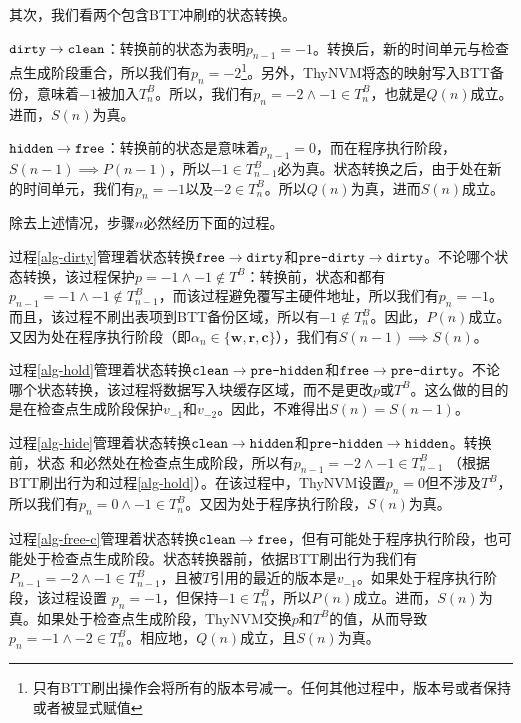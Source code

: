 其次，我们看两个包含BTT冲刷$\mathbf{f}$的状态转换。

$\texttt{dirty} \rightarrow \texttt{clean}$：转换前的状态为表明$p_{n-1}=-1$。转换后，新的时间单元与检查点生成阶段重合，所以我们有$p_n=-2$\footnote{只有BTT刷出操作会将所有的版本号减一。任何其他过程中，版本号或者保持或者被显式赋值}。另外，ThyNVM将态的映射写入BTT备份，意味着$-1$被加入$T^B_n$。所以，我们有$p_n=-2 \wedge -1 \in T^B_n$，也就是$Q(n)$成立。进而，$S(n)$为真。

$\texttt{hidden} \rightarrow \texttt{free}$：转换前的状态是意味着$p_{n-1}=0$，而在程序执行阶段，$S(n-1) \implies P(n-1)$，所以$-1 \in T^B_{n-1}$必为真。状态转换之后，由于处在新的时间单元，我们有$p_n=-1$以及$-2 \in T^B_n$。所以$Q(n)$为真，进而$S(n)$成立。

除去上述情况，步骤$n$必然经历下面的过程。

过程\ref{alg-dirty}管理着状态转换$\texttt{free} \rightarrow
\texttt{dirty}$和$\texttt{pre-dirty} \rightarrow \texttt{dirty}$。不论哪个状态转换，该过程保护$p=-1 \wedge -1 \notin T^B$：转换前，状态和都有$p_{n-1}=-1 \wedge -1 \notin
T^B_{n-1}$，而该过程避免覆写主硬件地址，所以我们有$p_n=-1$。而且，该过程不刷出表项到BTT备份区域，所以有$-1 \notin T^B_n$。因此，$P(n)$成立。又因为处在程序执行阶段（即$\alpha_n \in \{\mathbf{w}, \mathbf{r}, \mathbf{c}\}$），我们有$S(n-1) \implies S(n)$。

过程\ref{alg-hold}管理着状态转换$\texttt{clean} \rightarrow
\texttt{pre-hidden}$和$\texttt{free} \rightarrow \texttt{pre-dirty}$。不论哪个状态转换，该过程将数据写入块缓存区域，而不是更改$p$或$T^B$。这么做的目的是在检查点生成阶段保护$v_{-1}$和$v_{-2}$。因此，不难得出$S(n)=S(n-1)$。

过程\ref{alg-hide}管理着状态转换$\texttt{clean} \rightarrow
\texttt{hidden}$和$\texttt{pre-hidden} \rightarrow \texttt{hidden}$。转换前，状态 和必然处在检查点生成阶段，所以有$p_{n-1}=-2 \wedge -1 \in T^B_{n-1}$ （根据BTT刷出行为和过程\ref{alg-hold}）。在该过程中，ThyNVM设置$p_n=0$但不涉及$T^B$，所以我们有$p_n=0 \wedge -1 \in T^B_n$。又因为处于程序执行阶段，$S(n)$为真。

过程\ref{alg-free-c}管理着状态转换$\texttt{clean} \rightarrow \texttt{free}$，但有可能处于程序执行阶段，也可能处于检查点生成阶段。状态转换器前，依据BTT刷出行为我们有
$P_{n-1}=-2 \wedge -1 \in T^B_{n-1}$，且被$T$引用的最近的版本是$v_{-1}$。如果处于程序执行阶段，该过程设置
$p_n=-1$，但保持$-1 \in T^B_n$，所以$P(n)$成立。进而，$S(n)$为真。如果处于检查点生成阶段，ThyNVM交换$p$和$T^B$的值，从而导致
$p_n=-1 \wedge -2 \in T^B_n$。相应地，$Q(n)$成立，且$S(n)$为真。

